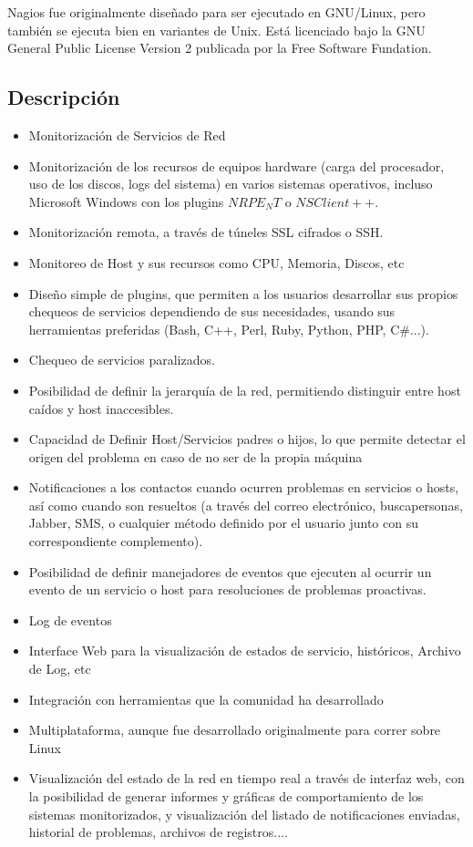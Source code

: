 \documentclass[11pt,a4paper]{article}
\begin{document}
    Nagios\cite{web} fue originalmente diseñado para ser ejecutado en GNU/Linux, pero también se ejecuta bien en variantes de Unix. Está licenciado bajo la GNU General Public License Version 2 publicada por la Free Software Fundation.
    
\subsection{Descripción}
\begin{itemize}

\item Monitorización de Servicios de Red
\item Monitorización de los recursos de equipos hardware (carga del procesador, uso de los discos, logs del sistema) en varios sistemas operativos, incluso Microsoft Windows con los plugins $NRPE_NT$ o $NSClient++$.
\item Monitorización remota, a través de túneles SSL cifrados o SSH.
\item Monitoreo de Host y sus recursos como CPU, Memoria, Discos, etc
\item Diseño simple de plugins, que permiten a los usuarios desarrollar sus propios chequeos de servicios dependiendo de sus necesidades, usando sus herramientas preferidas (Bash, C++, Perl, Ruby, Python, PHP, C\#...).
\item Chequeo de servicios paralizados.
\item Posibilidad de definir la jerarquía de la red, permitiendo distinguir entre host caídos y host inaccesibles.
\item Capacidad de Definir Host/Servicios padres o hijos, lo que permite detectar el origen del problema en caso de no ser de la propia máquina 
\item Notificaciones a los contactos cuando ocurren problemas en servicios o hosts, así como cuando son resueltos (a través del correo electrónico, buscapersonas, Jabber, SMS, o cualquier método definido por el usuario junto con su correspondiente complemento).
\item Posibilidad de definir manejadores de eventos que ejecuten al ocurrir un evento de un servicio o host para resoluciones de problemas proactivas.
\item Log de eventos
\item Interface Web para la visualización de estados de servicio, históricos, Archivo de Log, etc
\item Integración con herramientas que la comunidad ha desarrollado
\item Multiplataforma, aunque fue desarrollado originalmente para correr sobre Linux
\item Visualización del estado de la red en tiempo real a través de interfaz web, con la posibilidad de generar informes y gráficas de comportamiento de los sistemas monitorizados, y visualización del listado de notificaciones enviadas, historial de problemas, archivos de registros....

\end{itemize}
\end{document}
